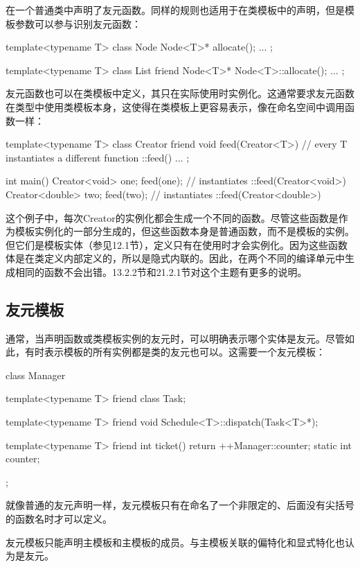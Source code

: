 在一个普通类中声明了友元函数。同样的规则也适用于在类模板中的声明，但是模板参数可以参与识别友元函数：

\begin{cpp}
template<typename T>
class Node {
	Node<T>* allocate();
	...
};

template<typename T>
class List {
	friend Node<T>* Node<T>::allocate();
	...
};
\end{cpp}

友元函数也可以在类模板中定义，其只在实际使用时实例化。这通常要求友元函数在类型中使用类模板本身，这使得在类模板上更容易表示，像在命名空间中调用函数一样：

\begin{cpp}
template<typename T>
class Creator {
	friend void feed(Creator<T>) { // every T instantiates a different function ::feed()
		...
	}
};

int main()
{
	Creator<void> one;
	feed(one); // instantiates ::feed(Creator<void>)
	Creator<double> two;
	feed(two); // instantiates ::feed(Creator<double>)
}
\end{cpp}

这个例子中，每次Creator的实例化都会生成一个不同的函数。尽管这些函数是作为模板实例化的一部分生成的，但这些函数本身是普通函数，而不是模板的实例。但它们是模板实体（参见12.1节），定义只有在使用时才会实例化。因为这些函数体是在类定义内部定义的，所以是隐式内联的。因此，在两个不同的编译单元中生成相同的函数不会出错。13.2.2节和21.2.1节对这个主题有更多的说明。

\subsection{友元模板}

通常，当声明函数或类模板实例的友元时，可以明确表示哪个实体是友元。尽管如此，有时表示模板的所有实例都是类的友元也可以。这需要一个友元模板：

\begin{cpp}
class Manager {
	template<typename T>
	friend class Task;
	
	template<typename T>
	friend void Schedule<T>::dispatch(Task<T>*);
	
	template<typename T>
		friend int ticket() {
			return ++Manager::counter;
		}
	static int counter;
};
\end{cpp}

就像普通的友元声明一样，友元模板只有在命名了一个非限定的、后面没有尖括号的函数名时才可以定义。

友元模板只能声明主模板和主模板的成员。与主模板关联的偏特化和显式特化也认为是友元。








